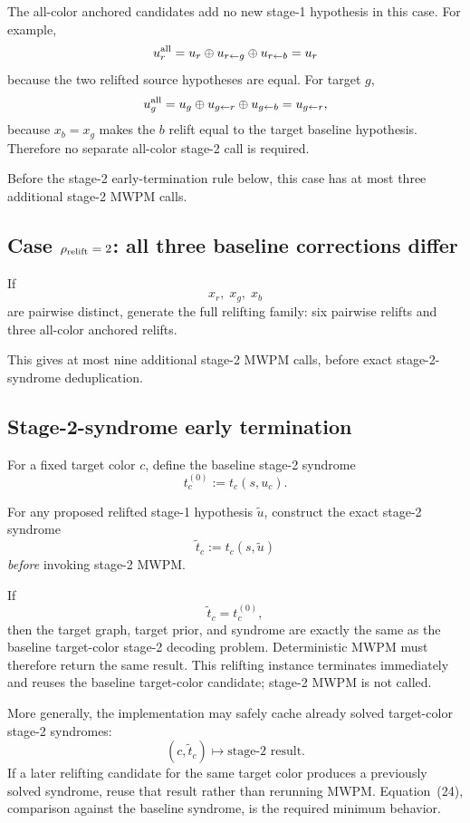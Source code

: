 \documentclass[11pt]{article}
\begin{document}
The all-color anchored candidates add no new stage-1 hypothesis in this case.
For example,
\[
    u_r^{\rm all}
    =
    u_r\oplus u_{r\leftarrow g}\oplus u_{r\leftarrow b}
    =
    u_r
\]
because the two relifted source hypotheses are equal.  For target $g$,
\[
    u_g^{\rm all}
    =
    u_g\oplus u_{g\leftarrow r}\oplus u_{g\leftarrow b}
    =
    u_{g\leftarrow r},
\]
because $x_b=x_g$ makes the $b$ relift equal to the target baseline hypothesis.
Therefore no separate all-color stage-2 call is required.

Before the stage-2 early-termination rule below, this case has at most three
additional stage-2 MWPM calls.

\subsection{Case $\rho_{\rm relift}=2$: all three baseline corrections differ}

If
\[
    x_r,\;x_g,\;x_b
\]
are pairwise distinct, generate the full relifting family:
six pairwise relifts and three all-color anchored relifts.

This gives at most nine additional stage-2 MWPM calls, before exact
stage-2-syndrome deduplication.

\subsection{Stage-2-syndrome early termination}

For a fixed target color $c$, define the baseline stage-2 syndrome
\[
    t_c^{(0)}:=t_c(s,u_c).
\]

For any proposed relifted stage-1 hypothesis $\tilde u$, construct the exact
stage-2 syndrome
\[
    \tilde t_c:=t_c(s,\tilde u)
\]
\emph{before} invoking stage-2 MWPM.

If
\[
    \tilde t_c=t_c^{(0)},
    \tag{24}
\]
then the target graph, target prior, and syndrome are exactly the same as the
baseline target-color stage-2 decoding problem.  Deterministic MWPM must
therefore return the same result.  This relifting instance terminates
immediately and reuses the baseline target-color candidate; stage-2 MWPM is not
called.

More generally, the implementation may safely cache already solved target-color
stage-2 syndromes:
\[
    (c,\tilde t_c)\longmapsto
    \text{stage-2 result}.
    \tag{25}
\]
If a later relifting candidate for the same target color produces a previously
solved syndrome, reuse that result rather than rerunning MWPM.  Equation~(24),
comparison against the baseline syndrome, is the required minimum behavior.
\end{document}
